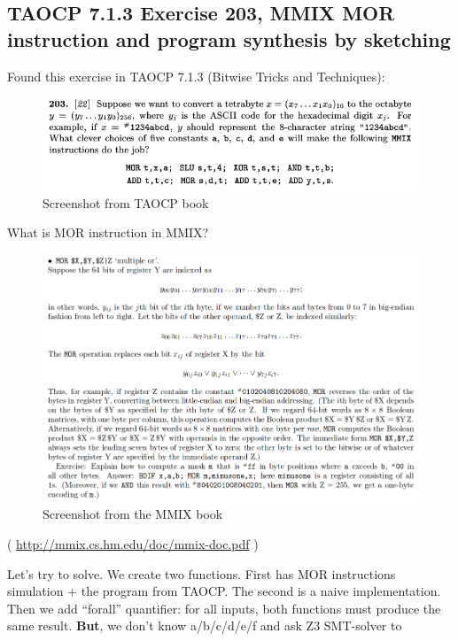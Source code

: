 \subsection{TAOCP 7.1.3 Exercise 203, MMIX MOR instruction and program synthesis by sketching}

Found this exercise in TAOCP 7.1.3 (Bitwise Tricks and Techniques):

\begin{figure}[H]
\label{fig:pipe_shuffled}
\centering
\includegraphics[scale=0.5]{pgm_synth/TAOCP_713_203/203q.png}
\caption{Screenshot from TAOCP book}
\end{figure}

What is MOR instruction in MMIX?

\begin{figure}[H]
\label{fig:pipe_shuffled}
\centering
\includegraphics[scale=0.5]{pgm_synth/TAOCP_713_203/MOR.png}
\caption{Screenshot from the MMIX book}
\end{figure}

( \url{http://mmix.cs.hm.edu/doc/mmix-doc.pdf} )

Let's try to solve. We create two functions. First has MOR instructions simulation + the program from TAOCP.
The second is a naive implementation.
Then we add ``forall'' quantifier: for all inputs, both functions must produce the same result.
\textbf{But}, we don't know a/b/c/d/e/f and ask Z3 SMT-solver to

